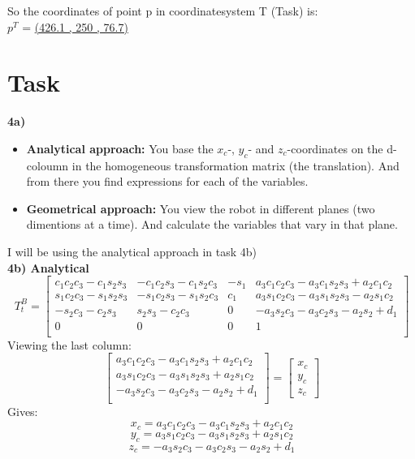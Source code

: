 \documentclass[12pt,norsk,a4paper]{article}
\begin{document}
        So the coordinates of point p in coordinatesystem T (Task) is:\\
        $p^T$ = \underline{(426.1 , 250 , 76.7)}
        \newpage
        

    \section{Task}
    \textbf{4a)}
    \begin{itemize}
        \item \textbf{Analytical approach:} You base the $x_c$-, $y_c$- and $z_c$-coordinates on the d-coloumn in the homogeneous transformation matrix (the translation). And from there you find expressions for each of the variables.
        \item \textbf{Geometrical approach:} You view the robot in different planes (two dimentions at a time). And calculate the variables that vary in that plane.
    \end{itemize}
    I will be using the analytical approach in task 4b)\\

    \textbf{4b) Analytical}\\
    \[T_t^{B} = \left[ \begin{array}{cccc}
        c_1c_2c_3-c_1s_2s_3 & -c_1c_2s_3-c_1s_2c_3 & -s_1 & a_3c_1c_2c_3-a_3c_1s_2s_3+a_2c_1c_2 \\
        s_1c_2c_3-s_1s_2s_3 & -s_1c_2s_3-s_1s_2c_3 & c_1 & a_3s_1c_2c_3-a_3s_1s_2s_3-a_2s_1c_2 \\
        -s_2c_3-c_2s_3 & s_2s_3-c_2c_3 & 0 & -a_3s_2c_3-a_3c_2s_3-a_2s_2+d_1 \\
        0 & 0 & 0 & 1 \\
        \end{array} \right]\]
    Viewing the last column:\\
    \[\left[ \begin{array}{c}
         a_3c_1c_2c_3-a_3c_1s_2s_3+a_2c_1c_2 \\
         a_3s_1c_2c_3-a_3s_1s_2s_3+a_2s_1c_2 \\
         -a_3s_2c_3-a_3c_2s_3-a_2s_2+d_1 \\
        \end{array} \right]
        = \left[\begin{array}{c}
            x_c\\y_c\\z_c
        \end{array}\right]\]
    Gives:\\
    \[x_c = a_3c_1c_2c_3-a_3c_1s_2s_3+a_2c_1c_2\]
    \[y_c = a_3s_1c_2c_3-a_3s_1s_2s_3+a_2s_1c_2 \]
    \[z_c = -a_3s_2c_3-a_3c_2s_3-a_2s_2+d_1\]
\end{document}

